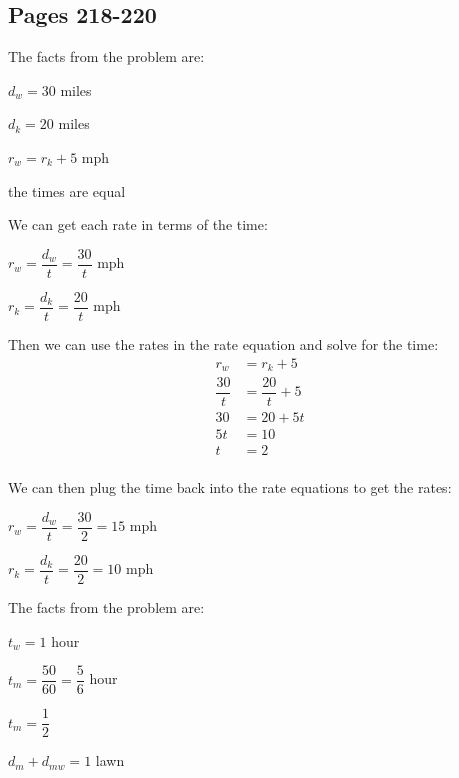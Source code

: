 \documentclass[fleqn,addpoints]{exam}
\begin{document}
\begin{description}

\subsection{Pages 218-220}
\item[46]

The facts from the problem are:
\begin{itemize*}
  \item $d_w = 30$ miles
  \item $d_k = 20$ miles
  \item $r_w = r_k + 5$ mph
  \item the times are equal
\end{itemize*}

We can get each rate in terms of the time:
\begin{itemize*}
  \item $r_w = \dfrac{d_w}{t} = \dfrac{30}{t}$ mph
  \item $r_k = \dfrac{d_k}{t} = \dfrac{20}{t}$ mph
\end{itemize*}

Then we can use the rates in the rate equation and solve for the time:
\begin{align*}
  r_w &= r_k + 5 \\
  \dfrac{30}{t} &= \dfrac{20}{t} + 5 \\
  30 &= 20 + 5t \\
  5t &= 10 \\
  t &= 2 \\
\end{align*}

We can then plug the time back into the rate equations to get the rates:
\begin{itemize*}
  \item $r_w = \dfrac{d_w}{t} = \dfrac{30}{2} = 15$ mph
  \item $r_k = \dfrac{d_k}{t} = \dfrac{20}{2} = 10$ mph
\end{itemize*}

\item[50]

The facts from the problem are:
\begin{itemize*}
  \item $t_w = 1$ hour
  \item $t_m = \dfrac{50}{60} = \dfrac{5}{6}$ hour
  \item $t_m = \dfrac{1}{2}$
  \item $d_m + d_{mw} = 1$ lawn
\end{itemize*}


\end{description}
\end{document}
